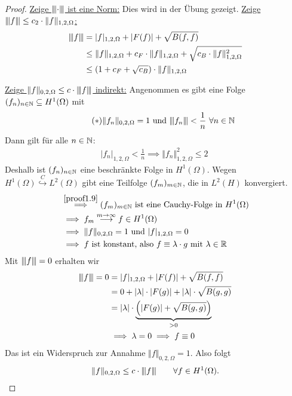 \begin{proof}
	\underline{Zeige ${\left\vert\kern-0.25ex\left\vert\kern-0.25ex\left\vert \cdot \right\vert\kern-0.25ex\right\vert\kern-0.25ex\right\vert}$ ist eine Norm:}
	Dies wird in der Übung gezeigt.\nl
	\underline{Zeige ${\left\vert\kern-0.25ex\left\vert\kern-0.25ex\left\vert f \right\vert\kern-0.25ex\right\vert\kern-0.25ex\right\vert}\leq c_2\cdot\Vert f\Vert_{1,2,\Omega}$:}
	\begin{align*}
		{\left\vert\kern-0.25ex\left\vert\kern-0.25ex\left\vert f \right\vert\kern-0.25ex\right\vert\kern-0.25ex\right\vert} &=
		|f|_{1,2,\Omega}+|F(f)|+\sqrt{B(f,f)}\\
		&\leq
		\Vert f\Vert_{1,2,\Omega} +c_F\cdot\Vert f\Vert_{1,2,\Omega}+\sqrt{c_B\cdot\Vert f\Vert^2_{1,2,\Omega}}\\
		&\leq
		(1+c_F+\sqrt{c_B})\cdot\Vert f\Vert_{1,2,\Omega}
	\end{align*}

	\underline{Zeige $\Vert f\Vert_{0,2,\Omega}\leq c\cdot{\left\vert\kern-0.25ex\left\vert\kern-0.25ex\left\vert f \right\vert\kern-0.25ex\right\vert\kern-0.25ex\right\vert}$ indirekt:}
	Angenommen es gibt eine Folge $(f_n)_{n\in\mathbb{N}}\subseteq H^1(\Omega)$ mit
	\begin{align}\label{proof1.9}\tag{$\ast$}
		\Vert f_n\Vert_{0,2,\Omega}=1\text{ und }{\left\vert\kern-0.25ex\left\vert\kern-0.25ex\left\vert f_n \right\vert\kern-0.25ex\right\vert\kern-0.25ex\right\vert}<\frac{1}{n}~\forall n\in\mathbb{N}
	\end{align}
	Dann gilt für alle $n\in\mathbb{N}$:
	\begin{align*}
		|f_n|_{1,2,\Omega}<\frac{1}{n}
		\implies
		\Vert f_n\Vert^2_{1,2,\Omega}\leq 2\
	\end{align*}
	Deshalb ist $(f_n)_{n\in\mathbb{N}}$ eine beschränkte Folge in $H^1(\Omega)$.
	Wegen $H^1(\Omega)\stackrel{C}{\hookrightarrow} L^2(\Omega)$ gibt eine Teilfolge $(f_m)_{m\in\mathbb{N}}$, die in $L^2(H)$ konvergiert.
	\begin{align*}
		&\stackrel{\eqref{proof1.9}}{\implies}
		(f_m)_{m\in\mathbb{N}}\text{ ist eine Cauchy-Folge in }H^1(\Omega)\\
		&\implies
		f_m\stackrel{m\to\infty}{\longrightarrow} f\in H^1(\Omega)\\
		&\implies
		\Vert f\Vert_{0,2,\Omega}=1\text{ und } |f|_{1,2,\Omega}=0\\
		&\implies
		f\text{ ist konstant, also } f\equiv \lambda\cdot g\text{ mit }\lambda\in\mathbb{R}
	\end{align*}
	Mit ${\left\vert\kern-0.25ex\left\vert\kern-0.25ex\left\vert f \right\vert\kern-0.25ex\right\vert\kern-0.25ex\right\vert}=0$ erhalten wir
	\begin{align*}
		{\left\vert\kern-0.25ex\left\vert\kern-0.25ex\left\vert f \right\vert\kern-0.25ex\right\vert\kern-0.25ex\right\vert} = 0
		&=|f|_{1,2,\Omega}+|F(f)|+\sqrt{B(f,f)}\\
		&=0+|\lambda|\cdot|F(g)|+|\lambda|\cdot\sqrt{B(g,g)}\\
		&=|\lambda|\cdot\underbrace{\Big(|F(g)|+\sqrt{B(g,g)}\Big)}_{>0}\\
		&\implies\lambda=0\implies f\equiv 0
	\end{align*}
	Das ist ein Widerspruch zur Annahme $\Vert f\Vert_{0,2,\Omega}=1$.
	Also folgt
	\begin{align*}
		\Vert f\Vert_{0,2,\Omega}\leq c\cdot{\left\vert\kern-0.25ex\left\vert\kern-0.25ex\left\vert f \right\vert\kern-0.25ex\right\vert\kern-0.25ex\right\vert}\qquad\forall f\in H^1(\Omega).
	\end{align*}


\end{proof}
